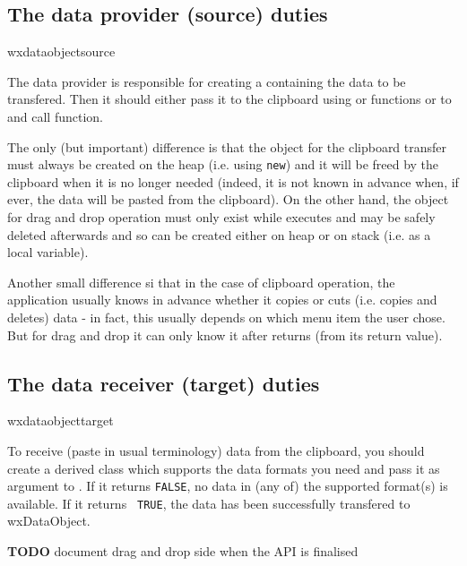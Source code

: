 \subsection{The data provider (source) duties}{wxdataobjectsource}

The data provider is responsible for creating a 
 containing the data to be
transfered. Then it should either pass it to the clipboard using
 or 
functions or to  and call 
 function.

The only (but important) difference is that the object for the clipboard
transfer must always be created on the heap (i.e. using {\tt new}) and it will
be freed by the clipboard when it is no longer needed (indeed, it is not known
in advance when, if ever, the data will be pasted from the clipboard). On the
other hand, the object for drag and drop operation must only exist while 
 executes and may be safely deleted
afterwards and so can be created either on heap or on stack (i.e. as a local
variable).

Another small difference si that in the case of clipboard operation, the
application usually knows in advance whether it copies or cuts (i.e. copies and
deletes) data - in fact, this usually depends on which menu item the user
chose. But for drag and drop it can only know it after 
 returns (from its return value).

\subsection{The data receiver (target) duties}{wxdataobjecttarget}

To receive (paste in usual terminology) data from the clipboard, you should
create a  derived class which supports the
data formats you need and pass it as argument to 
. If it returns {\tt FALSE},
no data in (any of) the supported format(s) is available. If it returns {\tt
TRUE}, the data has been successfully transfered to wxDataObject.

{\bf TODO} document drag and drop side when the API is finalised
